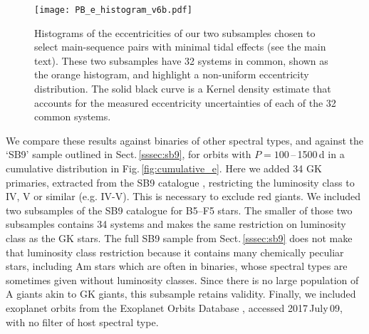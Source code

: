 \documentclass[a4paper,fleqn,usenatbib]{mnras}
\begin{document}
\begin{figure}
\begin{center}
\texttt{[image: PB\_e\_histogram\_v6b.pdf]}
\caption{Histograms of the eccentricities of our two subsamples chosen to select main-sequence pairs with minimal tidal effects (see the main text). These two subsamples have 32 systems in common, shown as the orange histogram, and highlight a non-uniform eccentricity distribution. The solid black curve is a Kernel density estimate that accounts for the measured eccentricity uncertainties of each of the 32 common systems.}
\label{fig:e_hist}
\end{center}
\end{figure}

We compare these results against binaries of other spectral types, and against the `SB9' sample outlined in Sect.\,\ref{sssec:sb9}, for orbits with $P=100$\,--\,1500\,d in a cumulative distribution in Fig.\,\ref{fig:cumulative_e}. Here we added 34 GK primaries, extracted from the SB9 catalogue \citep{pourbaixetal2004}, restricting the luminosity class to IV, V or similar (e.g. IV-V). This is necessary to exclude red giants. We included two subsamples of the SB9 catalogue for B5--F5 stars. The smaller of those two subsamples contains 34 systems and makes the same restriction on luminosity class as the GK stars. The full SB9 sample from Sect.\,\ref{sssec:sb9} does not make that luminosity class restriction because it contains many chemically peculiar stars, including Am stars which are often in binaries, whose spectral types are sometimes given without luminosity classes. Since there is no large population of A giants akin to GK giants, this subsample retains validity. Finally, we included exoplanet orbits from the Exoplanet Orbits Database \citep{hanetal2014}, accessed 2017\,July\,09, with no filter of host spectral type.
\end{document}
